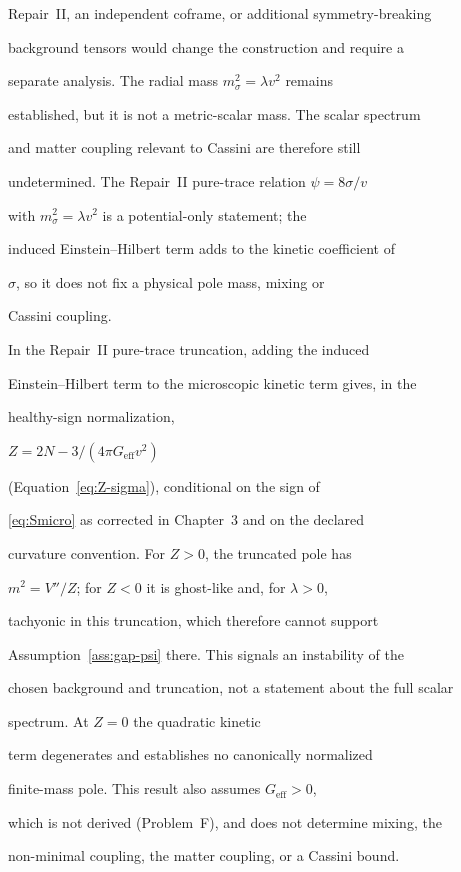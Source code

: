 Repair~II, an independent coframe, or additional symmetry-breaking

background tensors would change the construction and require a

separate analysis. The radial mass \(m_\sigma^2=\lambda v^2\) remains

established, but it is not a metric-scalar mass. The scalar spectrum

and matter coupling relevant to Cassini are therefore still

undetermined. The Repair~II pure-trace relation \(\psi=8\sigma/v\)

with \(m_\sigma^2=\lambda v^2\) is a potential-only statement; the

induced Einstein--Hilbert term adds to the kinetic coefficient of

\(\sigma\), so it does not fix a physical pole mass, mixing or

Cassini coupling.



In the Repair~II pure-trace truncation, adding the induced

Einstein--Hilbert term to the microscopic kinetic term gives, in the

healthy-sign normalization,

\(Z=2N-3/(4\pi G_{\mathrm{eff}}v^{2})\)

(Equation~\ref{eq:Z-sigma}), conditional on the sign of

\eqref{eq:Smicro} as corrected in Chapter~3 and on the declared

curvature convention. For \(Z>0\), the truncated pole has

\(m^{2}=V''/Z\); for \(Z<0\) it is ghost-like and, for \(\lambda>0\),

tachyonic in this truncation, which therefore cannot support

Assumption~\ref{ass:gap-psi} there. This signals an instability of the

chosen background and truncation, not a statement about the full scalar

spectrum. At \(Z=0\) the quadratic kinetic

term degenerates and establishes no canonically normalized

finite-mass pole. This result also assumes \(G_{\mathrm{eff}}>0\),

which is not derived (Problem~F), and does not determine mixing, the

non-minimal coupling, the matter coupling, or a Cassini bound.

